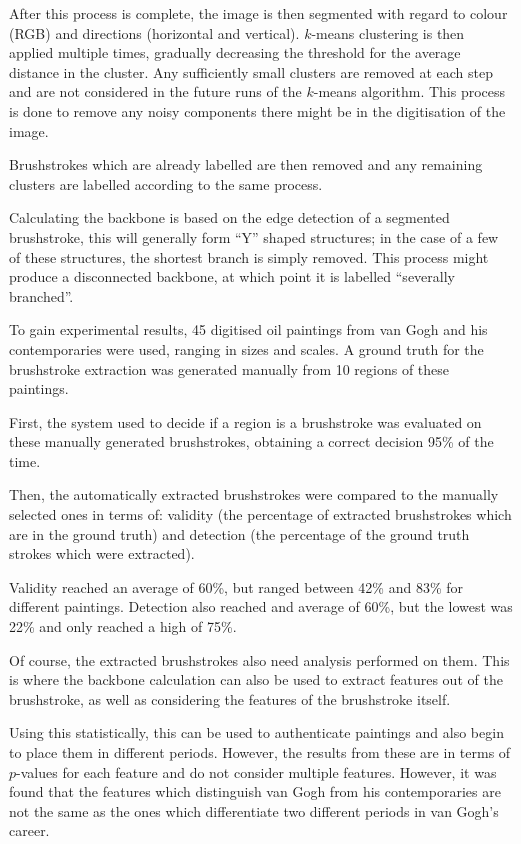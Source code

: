 \documentclass[conference]{IEEEtran}
\begin{document}
After this process is complete, the image is then segmented with regard to
colour (\gls{RGB}) and directions (horizontal and vertical). $k$-means
clustering is then applied multiple times, gradually decreasing the threshold
for the average distance in the cluster. Any sufficiently small clusters are
removed at each step and are not considered in the future runs of the $k$-means
algorithm. This process is done to remove any noisy components there might be
in the digitisation of the image.

Brushstrokes which are already labelled are then removed and any remaining
clusters are labelled according to the same process.

Calculating the backbone is based on the edge detection of a segmented
brushstroke, this will generally form ``Y'' shaped structures; in the case of a
few of these structures, the shortest branch is simply removed. This process
might produce a disconnected backbone, at which point it is labelled
``severally branched''.

To gain experimental results, 45 digitised oil paintings from van Gogh and his
contemporaries were used, ranging in sizes and scales. A ground truth for the
brushstroke extraction was generated manually from 10 regions of these
paintings.

First, the system used to decide if a region is a brushstroke was evaluated on
these manually generated brushstrokes, obtaining a correct decision 95\% of the
time.

Then, the automatically extracted brushstrokes were compared to the manually
selected ones in terms of: validity (the percentage of extracted brushstrokes
which are in the ground truth) and detection (the percentage of the ground
truth strokes which were extracted).

Validity reached an average of 60\%, but ranged between 42\% and 83\% for
different paintings. Detection also reached and average of 60\%, but the lowest
was 22\% and only reached a high of 75\%.

Of course, the extracted brushstrokes also need analysis performed on them.
This is where the backbone calculation can also be used to extract features out
of the brushstroke, as well as considering the features of the brushstroke
itself.

Using this statistically, this can be used to authenticate paintings and also
begin to place them in different periods. However, the results from these are
in terms of $p$-values for each feature and do not consider multiple features.
However, it was found that the features which distinguish van Gogh from his
contemporaries are not the same as the ones which differentiate two different
periods in van Gogh's career.
\end{document}
